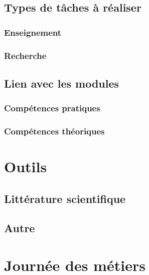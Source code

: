 \documentclass[12pt, a4paper]{report}
\begin{document}
  \section{Types de tâches à réaliser}

    \subsection{Enseignement}

    \subsection{Recherche}

  \section{Lien avec les modules}

    \subsection{Compétences pratiques}

    \subsection{Compétences théoriques}

\chapter{Outils}

  \section{Littérature scientifique}

  \section{Autre}

\chapter{Journée des métiers}
\end{document}
